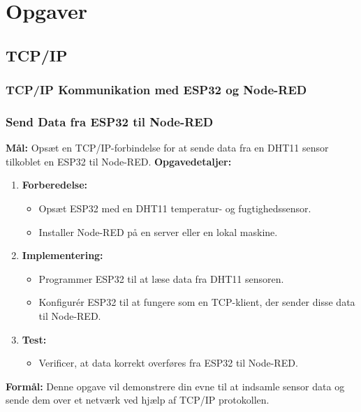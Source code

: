 \chapter{Opgaver}
\section{TCP/IP}
\subsection*{TCP/IP Kommunikation med ESP32 og Node-RED}
\subsection*{Send Data fra ESP32 til Node-RED}
\textbf{Mål:} Opsæt en TCP/IP-forbindelse for at sende data fra en DHT11 sensor tilkoblet en ESP32 til Node-RED.
\newline\newline\noindent
\textbf{Opgavedetaljer:}
\begin{enumerate}
	\item \textbf{Forberedelse:}
	\begin{itemize}
		\item Opsæt ESP32 med en DHT11 temperatur- og fugtighedssensor.
		\item Installer Node-RED på en server eller en lokal maskine.
	\end{itemize}
	\item \textbf{Implementering:}
	\begin{itemize}
		\item Programmer ESP32 til at læse data fra DHT11 sensoren.
		\item Konfigurér ESP32 til at fungere som en TCP-klient, der sender disse data til Node-RED.
	\end{itemize}
	\item \textbf{Test:}
	\begin{itemize}
		\item Verificer, at data korrekt overføres fra ESP32 til Node-RED.
	\end{itemize}
\end{enumerate}
\textbf{Formål:} Denne opgave vil demonstrere din evne til at indsamle sensor data og sende dem over et netværk ved hjælp af TCP/IP protokollen.

